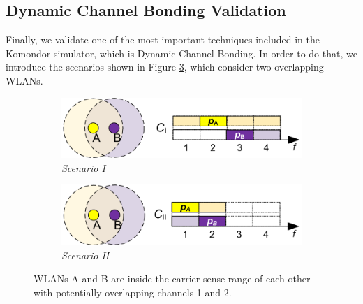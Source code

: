 \documentclass[a4paper]{article}
\begin{document}
	\subsection{Dynamic Channel Bonding Validation}
	\label{section:validations_channel_bonding}
	Finally, we validate one of the most important techniques included in the Komondor simulator, which is Dynamic Channel Bonding. In order to do that, we introduce the scenarios shown in Figure \ref{fig:cb_scenarios}, which consider two overlapping WLANs.
	\begin{figure}[h!]
		\centering
		\begin{subfigure}[b]{0.475\textwidth}
			\includegraphics[width=1\textwidth]{images/scenario_I.png}
			\caption{\textit{Scenario I}}
			\label{fig:scenario_I}
		\end{subfigure}
		\begin{subfigure}[b]{0.475\textwidth}
			\includegraphics[width=1\textwidth]{images/scenario_II.png}
			\caption{\textit{Scenario II}}
			\label{fig:scenario_II}
		\end{subfigure}
		\caption{WLANs A and B are inside the carrier sense range of each other with potentially overlapping channels 1 and 2.}
		\label{fig:cb_scenarios}
	\end{figure}
	
\end{document}

